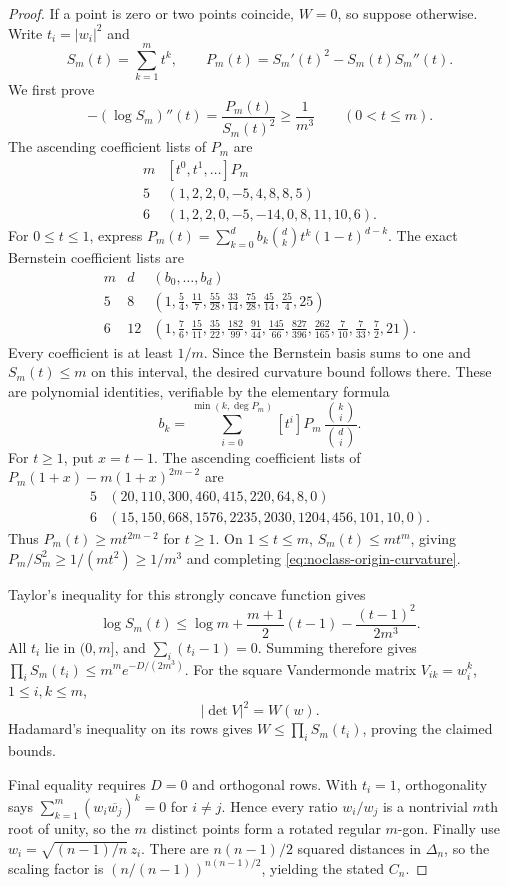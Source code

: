 \documentclass[11pt]{article}
\theoremstyle{remark}
\numberwithin{equation}{section}
\begin{document}
\begin{proof}
If a point is zero or two points coincide, $W=0$, so suppose otherwise.
Write $t_i=|w_i|^2$ and
\[
 S_m(t)=\sum_{k=1}^m t^k,\qquad
 P_m(t)=S_m'(t)^2-S_m(t)S_m''(t).
\]
We first prove
\begin{equation}\label{eq:noclass-origin-curvature}
 -(\log S_m)''(t)=\frac{P_m(t)}{S_m(t)^2}
 \ge\frac1{m^3}\qquad(0<t\le m).
\end{equation}
The ascending coefficient lists of $P_m$ are
\[
\begin{array}{c|l}
m&[t^0,t^1,\ldots]P_m\\ \hline
5&(1,2,2,0,-5,4,8,8,5)\\
6&(1,2,2,0,-5,-14,0,8,11,10,6).
\end{array}
\]
For $0\le t\le1$, express
$P_m(t)=\sum_{k=0}^{d}b_k\binom dk t^k(1-t)^{d-k}$.
The exact Bernstein coefficient lists are
\[
\begin{array}{c|c|l}
m&d&(b_0,\ldots,b_d)\\ \hline
5&8&
\left(1,\frac54,\frac{11}7,\frac{55}{28},\frac{33}{14},
\frac{75}{28},\frac{45}{14},\frac{25}4,25\right)\\[2pt]
6&12&
\left(1,\frac76,\frac{15}{11},\frac{35}{22},\frac{182}{99},
\frac{91}{44},\frac{145}{66},\frac{827}{396},
\frac{262}{165},\frac7{10},\frac7{33},\frac72,21\right).
\end{array}
\]
Every coefficient is at least $1/m$. Since the Bernstein basis sums
to one and $S_m(t)\le m$ on this interval, the desired curvature
bound follows there. These are polynomial identities, verifiable by
the elementary formula
\[
 b_k=\sum_{i=0}^{\min(k,\deg P_m)}
 [t^i]P_m\,\frac{\binom ki}{\binom di}.
\]
For $t\ge1$, put $x=t-1$. The ascending coefficient lists of
$P_m(1+x)-m(1+x)^{2m-2}$ are
\[
\begin{array}{c|l}
5&(20,110,300,460,415,220,64,8,0)\\
6&(15,150,668,1576,2235,2030,1204,456,101,10,0).
\end{array}
\]
Thus $P_m(t)\ge m t^{2m-2}$ for $t\ge1$. On $1\le t\le m$,
$S_m(t)\le m t^m$, giving
$P_m/S_m^2\ge1/(m t^2)\ge1/m^3$ and completing
\eqref{eq:noclass-origin-curvature}.

Taylor's inequality for this strongly concave function gives
\[
 \log S_m(t)\le\log m+\frac{m+1}{2}(t-1)
                   -\frac{(t-1)^2}{2m^3}.
\]
All $t_i$ lie in $(0,m]$, and $\sum_i(t_i-1)=0$. Summing therefore
gives $\prod_iS_m(t_i)\le m^m e^{-D/(2m^3)}$.
For the square Vandermonde matrix $V_{ik}=w_i^k$, $1\le i,k\le m$,
\[
 |\det V|^2=W(w).
\]
Hadamard's inequality on its rows gives
$W\le\prod_iS_m(t_i)$, proving the claimed bounds.

Final equality requires $D=0$ and orthogonal rows. With $t_i=1$,
orthogonality says
$\sum_{k=1}^m(w_i\overline{w_j})^k=0$ for $i\ne j$.
Hence every ratio $w_i/w_j$ is a nontrivial $m$th root of unity,
so the $m$ distinct points form a rotated regular $m$-gon.
Finally use $w_i=\sqrt{(n-1)/n}\,z_i$. There are
$n(n-1)/2$ squared distances in $\Delta_n$, so the scaling factor
is $(n/(n-1))^{n(n-1)/2}$, yielding the stated $C_n$.
\end{proof}
\end{document}
